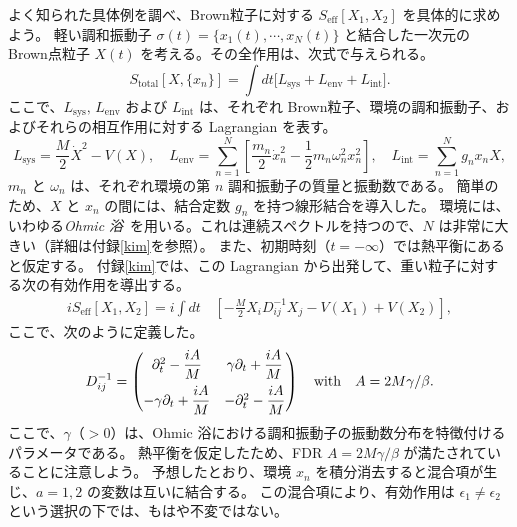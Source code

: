 よく知られた具体例を調べ、Brown粒子に対する $S_{\mathrm{eff}}[X_1,X_2]$ を具体的に求めよう。
軽い調和振動子 $\sigma (t) =\{x_1 (t), \cdots, x_N(t)\}$ と結合した一次元の Brown点粒子 $X(t)$ を考える。その全作用は、次式で与えられる。
\begin{equation}
 S_{\mathrm{total}}[X,\{x_n\}] 
  = \int dt 
  \Big[ L_{\mathrm{sys}} + L_{\mathrm{env}} + L_{\mathrm{int}} \Big] .
  \label{eq:TotalL}
\end{equation}
ここで、$L_{\mathrm{sys}},\, L_{\mathrm{env}}$ および $L_{\mathrm{int}}$ は、それぞれ Brown粒子、環境の調和振動子、およびそれらの相互作用に対する Lagrangian を表す。
\begin{equation}
 L_{\mathrm{sys}} 
  = \dfrac{M}{2} \dot{X}^2 - V (X), 
  \quad
  L_{\mathrm{env}} 
  =  \displaystyle{\sum_{n=1}^N }
  \left[ \dfrac{m_n}{2} \dot{x}_n^2 - \dfrac{1}{2} m_n \omega_n^2 x_n^2 \right], 
  \quad
  L_{\mathrm{int}} 
  =  \displaystyle{\sum_{n=1}^N} g_nx_n X , 
  \label{eq:EachL}
\end{equation}
$m_n$ と $\omega_n$ は、それぞれ環境の第 $n$ 調和振動子の質量と振動数である。
簡単のため、$X$ と $x_n$ の間には、結合定数 $g_n$ を持つ線形結合を導入した。
環境には、いわゆる\textit{Ohmic 浴}~\cite{kamenev2011field}を用いる。これは連続スペクトルを持つので、$N$ は非常に大きい（詳細は付録\ref{kim}を参照）。
また、初期時刻（$t=-\infty$）では熱平衡にあると仮定する。
付録\ref{kim}では、この Lagrangian から出発して、重い粒子に対する次の有効作用を導出する。
\begin{align}
 iS_{\mathrm{eff}} [X_1,X_2] 
 = i\int dt\, 
 &\left[ - \frac{M}{2} X_{i} D^{-1}_{ij} X_{j} - V(X_1) + V(X_2) \right], 
 \label{eq:MSR3}
\end{align}
ここで、次のように定義した。
\begin{align}
 D^{-1}_{ij}
 = \begin{pmatrix}
    \partial_{t}^{2}-\dfrac{iA}{M} & \gamma\partial_{t} + \dfrac{iA}{M} 
    \vspace{5pt} \\
    - \gamma\partial_{t} + \dfrac{iA}{M} & - \partial_{t}^{2} - \dfrac{iA}{M}
   \end{pmatrix}
   \quad
   {\rm with}
   \quad
   A=2M\gamma/\beta
   .
  \label{D-1}
\end{align}
ここで、$\gamma$（$>0$）は、Ohmic 浴における調和振動子の振動数分布を特徴付けるパラメータである。
熱平衡を仮定したため、FDR $A=2M\gamma/\beta$ が満たされていることに注意しよう。
予想したとおり、環境 $x_n$ を積分消去すると混合項が生じ、$a=1,2$ の変数は互いに結合する。
この混合項により、有効作用は $\epsilon_1 \neq \epsilon_2$ という選択の下では、もはや不変ではない。
